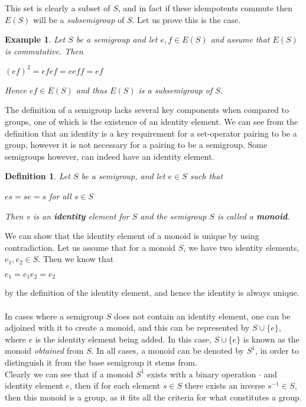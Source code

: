 \documentclass[12pt]{article}
\newtheorem{defn}[theorem]{Definition}
\newtheorem{ex}[theorem]{Example}
\begin{document}
This set is clearly a subset of $S$, and in fact if these idempotents commute then $E(S)$ will be a \textit{subsemigroup} of $S$. Let us prove this is the case.
\begin{ex}\label{ex2.11}
	Let $S$ be a semigroup and let $e, f \in E(S)$ and assume that $E(S)$ is commutative. Then
	\begin{center}
		$(ef)^2=efef=eeff=ef$
	\end{center}
Hence $ef \in E(S)$ and thus $E(S)$ is a subsemigroup of $S$.
\end{ex}
\noindent The definition of a semigroup lacks several key components when compared to groups, one of which is the existence of an identity element. We can see from the definition that an identity is a key requirement for a set-operator pairing to be a group, however it is not necessary for a pairing to be a semigroup. Some semigroups however, can indeed have an identity element.
\begin{defn}
	Let $S$ be a semigroup, and let $e \in S$ such that
	\begin{center}
		$es=se=s$ \qquad for all $s \in S$
	\end{center}
	Then e is an \textbf{identity} element for $S$ and the semigroup $S$ is called a \textbf{monoid}.
\end{defn}
\noindent We can show that the identity element of a monoid is unique by using contradiction. Let us assume that for a monoid $S$, we have two identity elements, $e_1, e_2 \in S$. Then we know that
\begin{center}
	$e_1=e_1e_2=e_2$
\end{center}
by the definition of the identity element, and hence the identity is always unique.\\
\\In cases where a semigroup $S$ does not contain an identity element, one can be adjoined with it to create a monoid, and this can be represented by $S \cup \{e\}$, where $e$ is the identity element being added. In this case, $S \cup \{e\}$ is known as the monoid \textit{obtained} from $S$\cite{3}. In all cases, a monoid can be denoted by $S^1$, in order to distinguish it from the base semigroup it stems from.\\
Clearly we can see that if a monoid $S^1$ exists with a binary operation $\cdot$ and identity element $e$, then if for each element $s \in S$ there exists an inverse $s^{-1} \in S$, then this monoid is a group, as it fits all the criteria for what constitutes a group.
\end{document}
